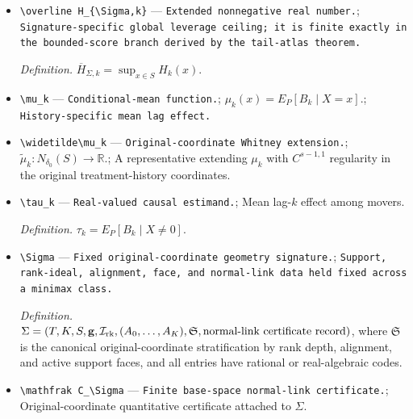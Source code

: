 \documentclass{article}
\begin{document}
\begin{itemize}
  \par\smallskip\noindent\emph{Definition.} \(H_k(x)=\|(M(x)')^+e_k\|_2\) for every \(x\), using the Moore--Penrose inverse; in particular \(H_k(0)=0\).
  \item \texttt{\textbackslash{}\allowbreak{}overline H\_\allowbreak{}\{\textbackslash{}\allowbreak{}Sigma,\allowbreak{}k\}\allowbreak{}} --- \texttt{Extended nonnegative real number.}; \texttt{Signature-\allowbreak{}specific global leverage ceiling;\allowbreak{} it is finite exactly in the bounded-\allowbreak{}score branch derived by the tail-\allowbreak{}atlas theorem.}
  \par\smallskip\noindent\emph{Definition.} \(\overline H_{\Sigma,k}=\sup_{x\in S}H_k(x)\).
  \item \texttt{\textbackslash{}\allowbreak{}mu\_\allowbreak{}k} --- \texttt{Conditional-\allowbreak{}mean function.}; \(\mu_k(x)=E_P[B_k\mid X=x]\).; \texttt{History-\allowbreak{}specific mean lag effect.}
  \item \texttt{\textbackslash{}\allowbreak{}widetilde\textbackslash{}\allowbreak{}mu\_\allowbreak{}k} --- \texttt{Original-\allowbreak{}coordinate Whitney extension.}; \(\widetilde\mu_k:N_{\delta_0}(S)\to\mathbb R\).; A representative extending \(\mu_k\) with \(C^{s-1,1}\) regularity in the original treatment-history coordinates.
  \item \texttt{\textbackslash{}\allowbreak{}tau\_\allowbreak{}k} --- \texttt{Real-\allowbreak{}valued causal estimand.}; Mean lag-\(k\) effect among movers.
  \par\smallskip\noindent\emph{Definition.} \(\tau_k=E_P[B_k\mid X\ne0]\).
  \item \texttt{\textbackslash{}\allowbreak{}Sigma} --- \texttt{Fixed original-\allowbreak{}coordinate geometry signature.}; \texttt{Support,\allowbreak{} rank-\allowbreak{}ideal,\allowbreak{} alignment,\allowbreak{} face,\allowbreak{} and normal-\allowbreak{}link data held fixed across a minimax class.}
  \par\smallskip\noindent\emph{Definition.} \(\Sigma=(T,K,S,\mathbf g,\mathcal I_{\rm rk},(A_0,\ldots,A_K),\mathfrak S,\text{normal-link certificate record})\), where \(\mathfrak S\) is the canonical original-coordinate stratification by rank depth, alignment, and active support faces, and all entries have rational or real-algebraic codes.
  \item \texttt{\textbackslash{}\allowbreak{}mathfrak C\_\allowbreak{}\textbackslash{}\allowbreak{}Sigma} --- \texttt{Finite base-\allowbreak{}space normal-\allowbreak{}link certificate.}; Original-coordinate quantitative certificate attached to \(\Sigma\).

\end{itemize}
\end{document}

